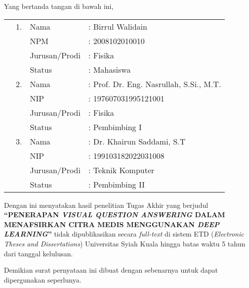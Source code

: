 \spernyataan %

\noindent
Yang bertanda tangan di bawah ini,
\vspace{-0.1cm}
\begin{table}[H]
{\renewcommand{\arraystretch}{0.7}
\begin{tabular}{M{0.6cm}lll}
	&1. 	& Nama   		&: Birrul Walidain \\
	&	& NPM       			&: 2008102010010   \\
	&	& Jurusan/Prodi   		&: Fisika \\
	&	& Status 				&: Mahasiswa \\  
	&2. 	& Nama  		&: Prof. Dr. Eng. Nasrullah, S.Si., M.T. \\
	&	& NIP       			&: 197607031995121001   \\
	&	& Jurusan/Prodi   		&: Fisika \\
	&	& Status 				&: Pembimbing I \\  
	&3. 	& Nama  		&: Dr. Khairun Saddami, S.T \\
	&	& NIP       			&: 199103182022031008   \\
	&	& Jurusan/Prodi   		&: Teknik Komputer \\
	&	& Status 				&: Pembimbing II   
\end{tabular}
}
\end{table}
\vspace{-0.4cm}
\noindent
Dengan ini menyatakan hasil penelitian Tugas Akhir yang berjudul \textbf{“PENERAPAN \textit{VISUAL QUESTION ANSWERING} DALAM MENAFSIRKAN CITRA MEDIS MENGGUNAKAN \textit{DEEP LEARNING}”} tidak dipublikasikan secara \textit{full-text} di sistem ETD (\textit{Electronic Theses and Dissertations}) Universitas Syiah Kuala hingga batas waktu 5 tahun dari tanggal kelulusan.

\vspace{0.4cm}
\noindent
Demikian surat pernyataan ini dibuat dengan sebenarnya untuk dapat dipergunakan seperlunya.

